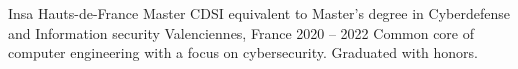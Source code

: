 
\begin{cventries}
  \cventry
    {Insa Hauts-de-France} %
    {Master CDSI equivalent to Master's degree in Cyberdefense and Information security} %
    {Valenciennes, France} %
    {2020 – 2022} %
    {Common core of computer engineering with a focus on cybersecurity. Graduated with honors.}
    

\end{cventries}

